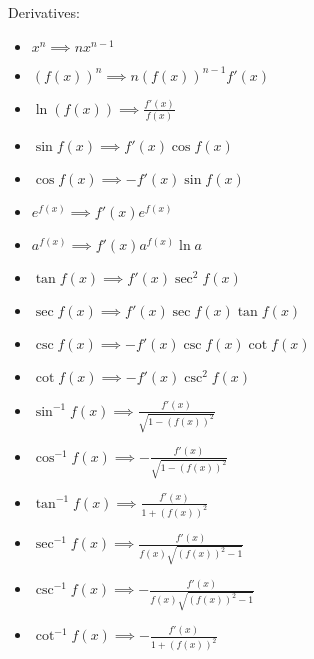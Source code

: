 \documentclass[10pt,a4paper,oneside]{book}
\begin{document}
Derivatives:
\begin{itemize}
    \item $x^n\implies nx^{n-1}$
    \item $(f(x))^n\implies n(f(x))^{n-1}f'(x)$
    \item $\ln(f(x))\implies \frac{f'(x)}{f(x)}$
    \item $\sin f(x) \implies f'(x)\cos f(x)$
    \item $\cos f(x) \implies -f'(x)\sin f(x)$
    \item $e^{f(x)}\implies f'(x)e^{f(x)}$
    \item $a^{f(x)}\implies f'(x)a^{f(x)}\ln a$
    \item $\tan f(x) \implies f'(x)\sec^2 f(x)$
    \item $\sec f(x) \implies f'(x)\sec f(x) \tan f(x)$
    \item $\csc f(x) \implies -f'(x)\csc f(x)\cot f(x)$
    \item $\cot f(x) \implies -f'(x)\csc^2 f(x)$
    \item $\sin^{-1}f(x)\implies \frac{f'(x)}{\sqrt{1-(f(x))^2}}$
    \item $\cos^{-1}f(x)\implies -\frac{f'(x)}{\sqrt{1-(f(x))^2}}$
    \item $\tan^{-1}f(x)\implies \frac{f'(x)}{1+(f(x))^2}$
    \item $\sec^{-1}f(x)\implies \frac{f'(x)}{f(x)\sqrt{(f(x))^2-1}}$
    \item $\csc^{-1}f(x)\implies -\frac{f'(x)}{f(x)\sqrt{(f(x))^2-1}}$
    \item $\cot^{-1}f(x)\implies -\frac{f'(x)}{1+(f(x))^2}$
\end{itemize}
\end{document}
